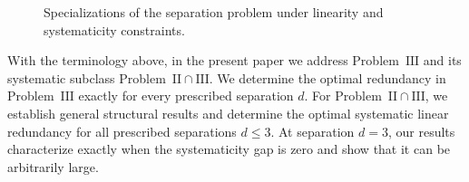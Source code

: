 \documentclass[a4paper,12pt]{article}
\theoremstyle{plain}
\theoremstyle{definition}
\newcommand{\Enc}{\operatorname{Enc}}
\begin{document}
\begin{figure}[!h]
\centering
{}
\caption{Specializations of the separation problem under linearity and systematicity constraints.}
\label{fig:problem-hierarchy}
\end{figure}



With the terminology above, in the present paper we address Problem~$\mathrm{III}$ and its systematic subclass Problem~$\mathrm{II}\cap\mathrm{III}$. 
We determine the optimal redundancy in Problem~$\mathrm{III}$
exactly for every prescribed separation $d$.
 For Problem~$\mathrm{II}\cap\mathrm{III}$, we establish general structural results and determine the optimal systematic linear redundancy for all prescribed separations $d\leq3$. At separation
$d=3$, our results characterize exactly when the systematicity gap
is zero and show that it can be arbitrarily large.
\end{document}
